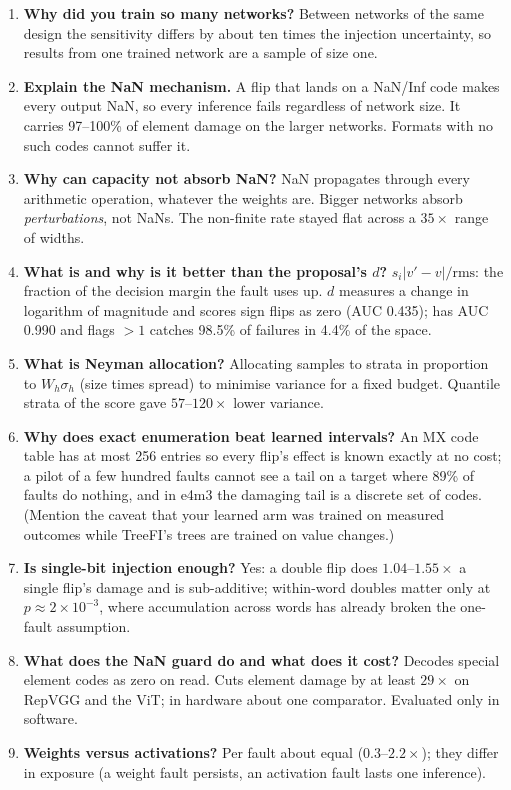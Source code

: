 \begin{enumerate}[leftmargin=0.7cm,itemsep=5pt]
\item \textbf{Why did you train so many networks?} Between networks of the same design the sensitivity differs by about ten times the injection uncertainty, so results from one trained network are a sample of size one.
\item \textbf{Explain the NaN mechanism.} A flip that lands on a NaN/Inf code makes every output NaN, so every inference fails regardless of network size. It carries 97--100\% of element damage on the larger networks. Formats with no such codes cannot suffer it.
\item \textbf{Why can capacity not absorb NaN?} NaN propagates through every arithmetic operation, whatever the weights are. Bigger networks absorb \emph{perturbations}, not NaNs. The non-finite rate stayed flat across a $35\times$ range of widths.
\item \textbf{What is  and why is it better than the proposal's $d$?} $s_i|v'-v|/\mathrm{rms}$: the fraction of the decision margin the fault uses up. $d$ measures a change in logarithm of magnitude and scores sign flips as zero (AUC 0.435);  has AUC 0.990 and flags $>1$ catches 98.5\% of failures in 4.4\% of the space.
\item \textbf{What is Neyman allocation?} Allocating samples to strata in proportion to $W_h\sigma_h$ (size times spread) to minimise variance for a fixed budget. Quantile strata of the score gave $57$--$120\times$ lower variance.
\item \textbf{Why does exact enumeration beat learned intervals?} An MX code table has at most 256 entries so every flip's effect is known exactly at no cost; a pilot of a few hundred faults cannot see a tail on a target where 89\% of faults do nothing, and in e4m3 the damaging tail is a discrete set of codes. (Mention the caveat that your learned arm was trained on measured outcomes while TreeFI's trees are trained on value changes.)
\item \textbf{Is single-bit injection enough?} Yes: a double flip does $1.04$--$1.55\times$ a single flip's damage and is sub-additive; within-word doubles matter only at $p\approx2\times10^{-3}$, where accumulation across words has already broken the one-fault assumption.
\item \textbf{What does the NaN guard do and what does it cost?} Decodes special element codes as zero on read. Cuts element damage by at least $29\times$ on RepVGG and the ViT; in hardware about one comparator. Evaluated only in software.
\item \textbf{Weights versus activations?} Per fault about equal ($0.3$--$2.2\times$); they differ in exposure (a weight fault persists, an activation fault lasts one inference).

\end{enumerate}
